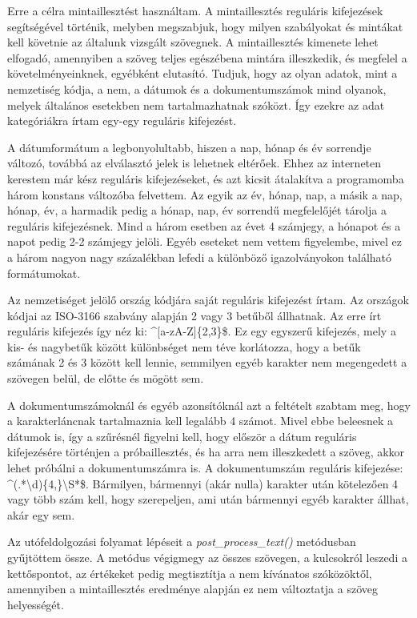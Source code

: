 \documentclass[12pt]{report}
\begin{document}
Erre a célra mintaillesztést használtam. A mintaillesztés reguláris kifejezések segítségével történik, melyben megszabjuk, hogy milyen szabályokat és mintákat kell követnie az általunk vizsgált szövegnek. A mintaillesztés kimenete lehet elfogadó, amennyiben a szöveg teljes egészébena mintára illeszkedik, és megfelel a követelményeinknek, egyébként elutasító.
Tudjuk, hogy az olyan adatok, mint a nemzetiség kódja, a nem, a dátumok és a dokumentumszámok mind olyanok, melyek általános esetekben nem tartalmazhatnak szóközt. Így ezekre az adat kategóriákra írtam egy-egy reguláris kifejezést.

A dátumformátum a legbonyolultabb, hiszen a nap, hónap és év sorrendje változó, továbbá az elválasztó jelek is lehetnek eltérőek. Ehhez az interneten kerestem már kész reguláris kifejezéseket, és azt kicsit átalakítva a programomba három konstans változóba felvettem. Az egyik az év, hónap, nap, a másik a nap, hónap, év, a harmadik pedig a hónap, nap, év sorrendű megfelelőjét tárolja a reguláris kifejezésnek. Mind a három esetben az évet 4 számjegy, a hónapot és a napot pedig 2-2 számjegy jelöli. Egyéb eseteket nem vettem figyelembe, mivel ez a három nagyon nagy százalékban lefedi a különböző igazolványokon található formátumokat.

Az nemzetiséget jelölő ország kódjára saját reguláris kifejezést írtam. Az országok kódjai az ISO-3166 szabvány alapján 2 vagy 3 betűből állhatnak. Az erre írt reguláris kifejezés így néz ki: \textasciicircum[a-zA-Z]\{2,3\}\$. Ez egy egyszerű kifejezés, mely a kis- és nagybetűk között különbséget nem téve korlátozza, hogy a betűk számának 2 és 3 között kell lennie, semmilyen egyéb karakter nem megengedett a szövegen belül, de előtte és mögött sem.

A dokumentumszámoknál és egyéb azonsítóknál azt a feltételt szabtam meg, hogy a karakterláncnak tartalmaznia kell legalább 4 számot. Mivel ebbe beleesnek a dátumok is, így a szűrésnél figyelni kell, hogy először a dátum reguláris kifejezésére történjen a próbaillesztés, és ha arra nem illeszkedett a szöveg, akkor lehet próbálni a dokumentumszámra is. A dokumentumszám reguláris kifejezése: \textasciicircum(.*\textbackslash d)\{4,\}\textbackslash S*\$. Bármilyen, bármennyi (akár nulla) karakter után kötelezően 4 vagy több szám kell, hogy szerepeljen, ami után bármennyi egyéb karakter állhat, akár egy sem.

Az utófeldolgozási folyamat lépéseit a \emph{post\_process\_text()} metódusban gyűjtöttem össze. A metódus végigmegy az összes szövegen, a kulcsokról leszedi a kettőspontot, az értékeket pedig megtisztítja a nem kívánatos szóközöktől, amennyiben a mintaillesztés eredménye alapján ez nem változtatja a szöveg helyességét.
\end{document}
